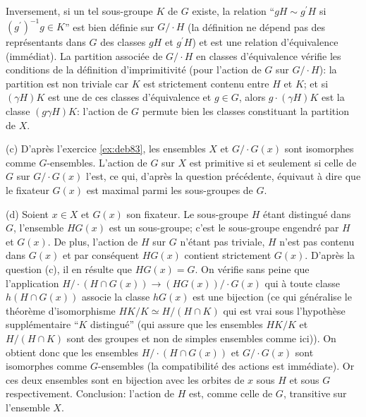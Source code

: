 {{\hskip 5mm Inversement, si un tel sous-groupe $K$ de $G$ existe, la relation ``$gH \sim g^\prime H$
si $(g^\prime)^{-1} g\in K$'' est bien d\'efinie sur $G/\cdot H$ (la d\'efinition ne
d\'epend pas des repr\'esentants dans $G$ des classes $gH$ et $g^\prime H$) et est une
relation d'\'equivalence (imm\'ediat). La partition associ\'ee de $G/\cdot H$ en classes
d'\'equivalence v\'erifie les conditions de la d\'efinition d'imprimitivit\'e (pour l'action
de $G$ sur $G/\cdot H$): la partition est non triviale car $K$ est strictement contenu entre
$H$ et $K$; et si $(\gamma H)K$ est une de ces classes d'\'equivalence et
$g\in G$, alors $g\cdot (\gamma H)K$ est la classe $(g\gamma H)K$: l'action de $G$ permute
bien les classes constituant la partition de $X$.
\medskip

(c) D'apr\`es l'exercice \ref{ex:deb83}, les ensembles $X$ et $G/\cdot G(x)$ sont isomorphes comme
$G$-ensembles. L'action de $G$ sur $X$ est primitive si et seulement si celle de $G$ sur
$G/\cdot G(x)$ l'est, ce qui, d'apr\`es la question pr\'ec\'edente, \'equivaut \`a dire que le
fixateur $G(x)$ est maximal parmi les sous-groupes de $G$.
\medskip 

(d) Soient $x\in X$ et $G(x)$ son fixateur. Le sous-groupe $H$ \'etant distingu\'e dans
$G$, l'ensemble $HG(x)$ est un sous-groupe; c'est le sous-groupe engendr\'e par $H$ et
$G(x)$. De plus, l'action de $H$ sur $G$ n'\'etant pas triviale, $H$ n'est pas contenu dans
$G(x)$ et par cons\'equent $HG(x)$ contient strictement $G(x)$. D'apr\`es la question (c), il
en r\'esulte que $HG(x) = G$. On v\'erifie sans peine que l'application $H/\cdot (H\cap G(x))
\rightarrow (HG(x))/\cdot G(x)$ qui \`a toute classe $h(H\cap G(x))$ associe la classe $hG(x)$
est une bijection (ce qui g\'en\'eralise le th\'eor\`eme d'isomorphisme
$HK/K\simeq H/(H\cap K)$ qui est vrai sous l'hypoth\`ese suppl\'ementaire ``$K$
distingu\'e'' (qui assure que les ensembles $HK/K$ et $H/(H\cap K)$ sont des groupes et non
de simples ensembles comme ici)). On obtient donc que les ensembles $H/\cdot (H\cap
G(x))$ et $G/\cdot G(x)$ sont isomorphes comme $G$-ensembles (la compatibilit\'e des
actions est imm\'ediate). Or ces deux ensembles sont en bijection avec les orbites de $x$
sous $H$ et sous $G$ respectivement. Conclusion: l'action de $H$ est, comme celle de $G$,
transitive sur l'ensemble $X$.
}
}
